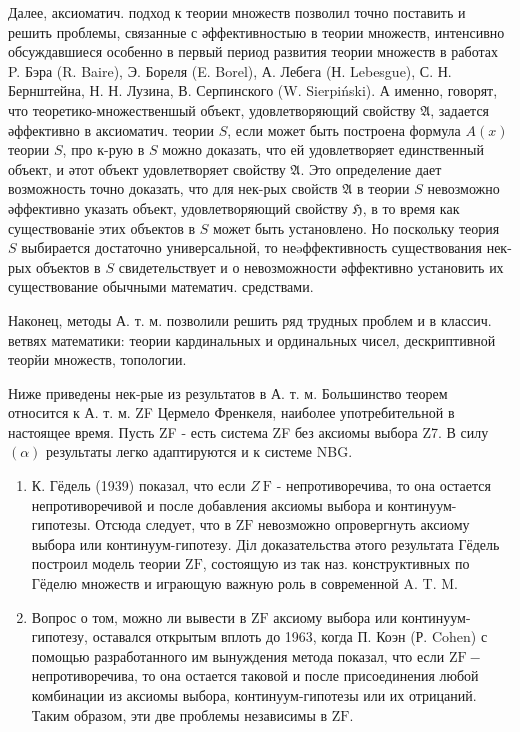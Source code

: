 \documentclass[10pt]{article}
\begin{document}
Далее, аксиоматич. подход к теории множеств позволил точно поставить и решить проблемы, связанные с әффективностыю в теории множеств, интенсивно обсуждавшиеся особенно в первый период развития теории множеств в работах P. Бэра (R. Baire), Э. Бореля (E. Borel), А. Лебега (Н. Lebesgue), С. Н. Бернштейна, Н. Н. Лузина, В. Серпинского (W. Sierpiński). А именно, говорят, что теоретико-множественшый объект, удовлетворяющий свойству $\mathfrak{A}$, задается әффективно в аксиоматич. теории $S$, если может быть построена формула $A(x)$ теории $S$, про к-рую в $S$ можно доказать, что ей удовлетворяет единственный объект, и әтот объект удовлетворяет свойству $\mathfrak{A}$. Это определение дает возможность точно доказать, что для нек-рых свойств $\mathfrak{A}$ в теории $S$ невозможно әффективно указать объект, удовлетворяющий свойству $\mathfrak{H}$, в то время как существованіе этих объектов в $S$ может быть установлено. Но поскольку теория $S$ выбирается достаточно универсальной, то неəффективность существования нек-рых объектов в $S$ свидетельствует и о невозможности әффективно установить их существование обычными математич. средствами.



Наконец, методы А. т. м. позволили решить ряд трудных проблем и в классич. ветвях математики: теории кардинальных и ординальных чисел, дескриптивной теорйи множеств, топологии.



Ниже приведены нек-рые из результатов в А. т. м. Большинство теорем относится к А. т. м. ZF Цермело Френкеля, наиболее употребительной в настоящее время. Пусть ZF - есть система ZF без аксиомы выбора Z7. В силу $(\alpha)$ результаты легко адаптируются и к системе NBG.



\begin{enumerate}

  \item К. Гёдель (1939) показал, что если $Z \mathrm{~F}$ - непротиворечива, то она остается непротиворечивой и после добавления аксиомы выбора и континуум-гипотезы. Отсюда следует, что в $\mathrm{ZF}$ невозможно опровергнуть аксиому выбора или континуум-гипотезу. Діл доказательства әтого результата Гёдель построил модель теории $\mathrm{ZF}$, состоящую из так наз. конструктивных по Гёделю множеств и играющую важную роль в современной A. T. M.



  \item Вопрос о том, можно ли вывести в $\mathrm{ZF}$ аксиому выбора или континуум-гипотезу, оставался открытым вплоть до 1963, когда П. Коэн (Р. Cohen) с помощью разработанного им вынуждения метода показал, что если $\mathrm{ZF}-$ непротиворечива, то она остается таковой и после присоединения любой комбинации из аксиомы выбора, континуум-гипотезы или их отрицаний. Таким образом, эти две проблемы независимы в $\mathrm{ZF}$.



\end{enumerate}
\end{document}
